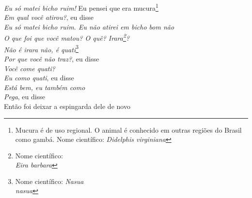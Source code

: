 \noindent   \textit{Eu só matei bicho ruim!}
  Eu pensei que era mucura\footnote{Mucura é de uso regional. O animal é conhecido em outras regiões do Brasil como gambá. Nome científico: \textit{Didelphis virginiana}}\\ %
  \textit{Em qual você atirou?}, eu disse\\
  \textit{Eu só matei bicho ruim. Eu não atirei em bicho bom não}\\
  \textit{O que foi que você matou? O quê? Irara\footnote{Nome científico:\\
   \textit{Eira barbara}}?}\\
  \textit{Não é irara não, é quati}\footnote{Nome científico: \textit{Nasua\\
   nasua}}\\
  \textit{Por que você não traz?}, eu disse\\
  \textit{Você come quati?}\\
  \textit{Eu como quati}, eu disse\\
  \textit{Está bem, eu também como}\\
  \textit{Pega}, eu disse\\
  Então foi deixar a espingarda dele de novo
 
 \smallskip
 \begin{center}\end{center}
 \smallskip
 
